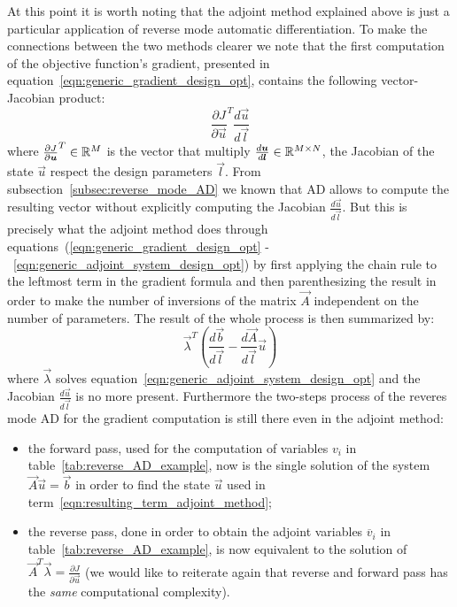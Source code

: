 \bigskip
At this point it is worth noting that the adjoint method explained above is just a particular application of reverse mode automatic differentiation. To make the connections between the two methods clearer we note that the first computation of the  objective function's gradient, presented in equation~\eqref{eqn:generic_gradient_design_opt}, contains the following vector-Jacobian product:
\begin{equation}
	\label{eqn:vJp_design_opt}
	\frac{\partial J}{\partial \vec{u}}^T \frac{d\vec{u}}{d\vec{l}}
\end{equation}
where $\frac{\partial J}{\partial \boldsymbol{u}}^T \in \mathbb{R}^M$ is the vector that multiply $\frac{d\boldsymbol{u}}{d\boldsymbol{l}} \in \mathbb{R}^{M \times N}$, the Jacobian of the state $\vec{u}$ respect the design parameters $\vec{l}$.
From subsection~\vref{subsec:reverse_mode_AD} we known that AD allows to compute the resulting vector without explicitly computing the Jacobian $\frac{d\vec{u}}{d\vec{l}}$. But this is precisely what the adjoint method does through equations~(\ref{eqn:generic_gradient_design_opt} -~\ref{eqn:generic_adjoint_system_design_opt}) by first applying the chain rule to the leftmost term in the gradient formula and then parenthesizing the result in order to make the number of inversions of the matrix $\vec{A}$ independent on the number of parameters.
The result of the whole process is then summarized by:
\begin{equation}
	\label{eqn:resulting_term_adjoint_method}
	\vec{\lambda}^T \left( \frac{d\vec{b}}{d\vec{l}} - \frac{d\vec{A}}{d\vec{l}}\vec{u} \right)
\end{equation}
where $\vec{\lambda}$ solves equation~\eqref{eqn:generic_adjoint_system_design_opt} and the Jacobian $\frac{d\vec{u}}{d\vec{l}}$ is no more present. Furthermore the two-steps process of the reveres mode AD for the gradient computation is still there even in the adjoint method:
\begin{itemize}
	\item the forward pass, used for the computation of variables $v_i$ in table~\vref{tab:reverse_AD_example}, now is the single solution of the system $\vec{A}\vec{u}=\vec{b}$ in order to find the state $\vec{u}$ used in term~\eqref{eqn:resulting_term_adjoint_method};
	\item the reverse pass, done in order to obtain the adjoint variables $\overline{v}_i$ in table~\ref{tab:reverse_AD_example}, is now equivalent to the solution of $\vec{A}^T \vec{\lambda} = \frac{\partial J}{\partial \vec{u}}$ (we would like to reiterate again that reverse and forward pass has the \emph{same} computational complexity). 
\end{itemize}














